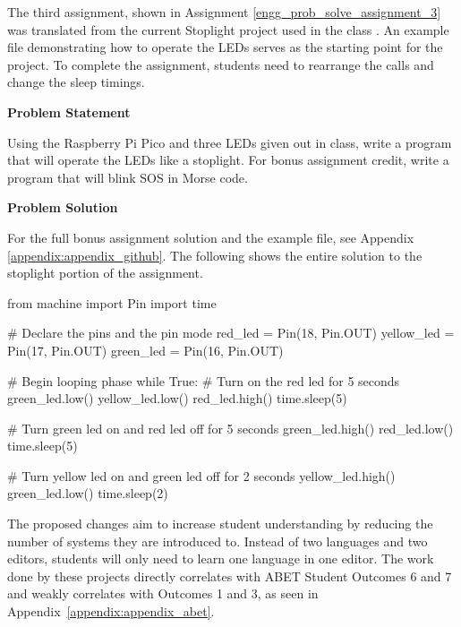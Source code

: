 The third assignment, shown in Assignment \ref{engg_prob_solve_assignment_3} was translated from the 
current Stoplight project used in the class \cite{stoplight}. An example file
demonstrating how to operate the LEDs serves as the starting point for the project. To complete the
assignment, students need to rearrange the  calls and change the sleep timings.

\label{engg_prob_solve_assignment_3}

\begin{tcolorbox}[breakable, enhanced jigsaw, title=DEN 161: Assignment \ref{engg_prob_solve_assignment_3}, 
    colframe=ksu-purple, colback=ksu-gray]

    \textbf{Problem Statement}
    \parindent15pt

    Using the Raspberry Pi Pico and three LEDs given out in class, write a program that will operate
    the LEDs like a stoplight. For bonus assignment credit, write a program that will blink SOS in Morse code.
    
    \tcblower
    \textbf{Problem Solution}
    \parindent15pt
    
    For the full bonus assignment solution and the example file, see Appendix \ref{appendix:appendix_github}. 
    The following shows the entire solution to the stoplight portion of the assignment.

\begin{python}
from machine import Pin
import time

# Declare the pins and the pin mode
red_led = Pin(18, Pin.OUT)
yellow_led = Pin(17, Pin.OUT)
green_led = Pin(16, Pin.OUT)

# Begin looping phase
while True:
    # Turn on the red led for 5 seconds
    green_led.low()
    yellow_led.low()
    red_led.high()
    time.sleep(5)

    # Turn green led on and red led off for 5 seconds
    green_led.high()
    red_led.low()
    time.sleep(5)

    # Turn yellow led on and green led off for 2 seconds
    yellow_led.high()
    green_led.low()
    time.sleep(2)
    \end{python}
\end{tcolorbox}

The proposed changes aim to increase student understanding by reducing the number of systems they are introduced 
to. Instead of two languages and two editors, students will only need to learn one language in one editor. The 
work done by these projects directly correlates with ABET Student Outcomes 6 and 7 and weakly correlates with 
Outcomes 1 and 3, as seen in Appendix~\ref{appendix:appendix_abet}.

